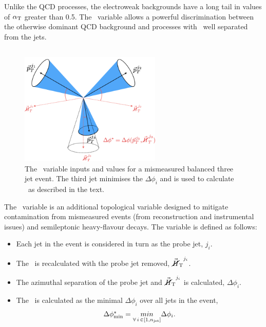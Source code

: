 Unlike the QCD processes, the electroweak backgrounds have a long tail in
values of $\alpha_{\text{T}}$ greater than 0.5. The \alphat~variable allows a powerful discrimination 
between the otherwise dominant QCD background and processes with \met~well
separated from the jets.

\subsection{\bdphi}
\begin{figure}
\centering
    \includegraphics[width=0.6\textwidth]{./Figures/alphat/bdphi_cartoon}
  \caption{\label{fig:bdphi_cartoon} The \bdphi~variable inputs and values for a mismeasured balanced three jet event.
  The third jet minimises the $\Delta \phi_i$ and is used to calculate \bdphi~as described in the text.}
\end{figure}
The \bdphi~variable is an additional topological variable designed to mitigate contamination
from mismeasured events (from reconstruction and instrumental issues) and semileptonic 
heavy-flavour decays. The variable is defined as follows:
\begin{itemize}
\item Each jet in the event is considered in turn as the probe jet, $j_i$.
\item The \mhtvec~is recalculated with the probe jet removed, $\mbox{$\vec{\cancel{H}}_{\rm T}$}^{j_i}$.
\item The azimuthal separation of the probe jet and $\mbox{$\vec{\cancel{H}}_{\rm T}$}^{j_i}$ is calculated, $\Delta \phi_i$.
\item The \bdphi~is calculated as the minimal $\Delta \phi_i$ over all jets in the event,
\begin{equation}
\label{equ:bdphi}
\mbox{$\Delta\phi^{*}_{\rm min}$} = \underset{\forall\, i\, \in \left[1,n_{\mathrm{jet}}\right]}{min} \Delta \phi_i.
\end{equation}
\end{itemize}

